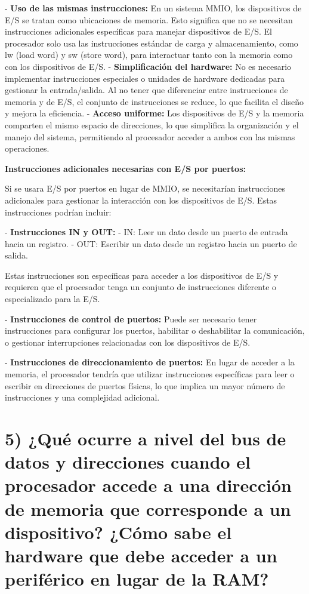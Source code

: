 \documentclass[12pt]{article}
\begin{document}
- \textbf{Uso de las mismas instrucciones:} En un sistema MMIO, los dispositivos de E/S se tratan como ubicaciones de memoria. Esto significa que no se necesitan instrucciones adicionales específicas para manejar dispositivos de E/S. El procesador solo usa las instrucciones estándar de carga y almacenamiento, como lw (load word) y sw (store word), para interactuar tanto con la memoria como con los dispositivos de E/S.
- \textbf{Simplificación del hardware:} No es necesario implementar instrucciones especiales o unidades de hardware dedicadas para gestionar la entrada/salida. Al no tener que diferenciar entre instrucciones de memoria y de E/S, el conjunto de instrucciones se reduce, lo que facilita el diseño y mejora la eficiencia.
- \textbf{Acceso uniforme:} Los dispositivos de E/S y la memoria comparten el mismo espacio de direcciones, lo que simplifica la organización y el manejo del sistema, permitiendo al procesador acceder a ambos con las mismas operaciones.

\textbf{Instrucciones adicionales necesarias con E/S por puertos:}

Si se usara E/S por puertos en lugar de MMIO, se necesitarían instrucciones adicionales para gestionar la interacción con los dispositivos de E/S. Estas instrucciones podrían incluir:

- \textbf{Instrucciones IN y OUT:}
    - IN: Leer un dato desde un puerto de entrada hacia un registro.
    - OUT: Escribir un dato desde un registro hacia un puerto de salida.

Estas instrucciones son específicas para acceder a los dispositivos de E/S y requieren que el procesador tenga un conjunto de instrucciones diferente o especializado para la E/S.

- \textbf{Instrucciones de control de puertos:} Puede ser necesario tener instrucciones para configurar los puertos, habilitar o deshabilitar la comunicación, o gestionar interrupciones relacionadas con los dispositivos de E/S.

- \textbf{Instrucciones de direccionamiento de puertos:} En lugar de acceder a la memoria, el procesador tendría que utilizar instrucciones específicas para leer o escribir en direcciones de puertos físicas, lo que implica un mayor número de instrucciones y una complejidad adicional.

\vspace{1cm}
\vspace{1cm}

\section*{5) ¿Qué ocurre a nivel del bus de datos y direcciones cuando el procesador accede a una dirección de memoria que corresponde a un dispositivo? ¿Cómo sabe el hardware que debe acceder a un periférico en lugar de la RAM?}
\end{document}
